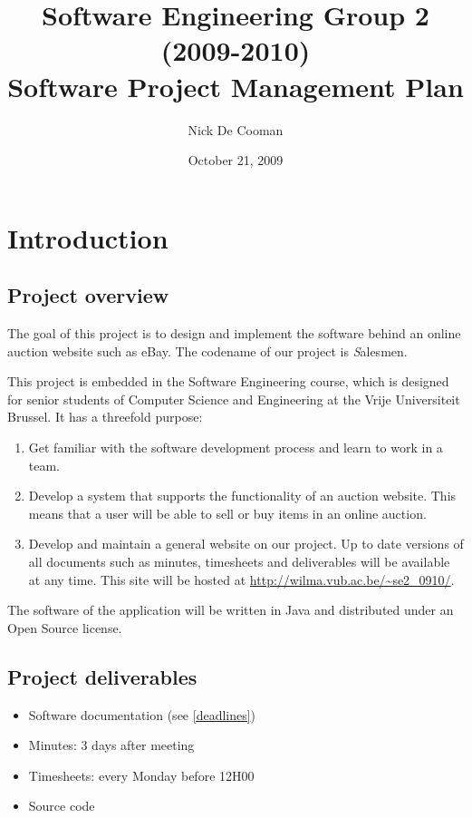 \documentclass[a4paper, 12pt]{report}
\title{Software Engineering Group 2 (2009-2010) \\Software Project Management Plan}
\author{Nick De Cooman}
\date {October 21, 2009}
\begin{document}
	
	\maketitle
	
	\setcounter{tocdepth}{1}	
	\tableofcontents
	
	\chapter{Introduction}
	
		\section{Project overview}
		
			The goal of this project is to design and implement the software 
			behind an online auction website such as eBay. The codename of our project 
			is {\emph Salesmen}. 

			This project is embedded in the Software Engineering course, 
			which is designed for senior students of Computer Science and Engineering 
			at the Vrije Universiteit Brussel. It has a threefold purpose:
			
			\begin{enumerate}
				\item Get familiar with the software development process and learn to work
				in a team.
				
				\item Develop a system that supports the functionality of an auction website. 
				This means that a user will be able to sell or buy items in an online auction. 
				
				\item Develop and maintain a general website on our project. Up to date 
				versions of all documents such as minutes, timesheets and deliverables will be 
				available at any time. This site will be hosted at
				\url{http://wilma.vub.ac.be/~se2_0910/}.
			\end{enumerate}	
			
			The software of the application will be written in Java and 
			distributed under an Open Source license.	
		
		\section{Project deliverables}
		
		\begin{itemize}
			
			\item Software documentation (see \ref{deadlines})
			\item Minutes: 3 days after meeting
			\item Timesheets: every Monday before 12H00
			\item Source code
			
		\end{itemize}	
		
\end{document}
